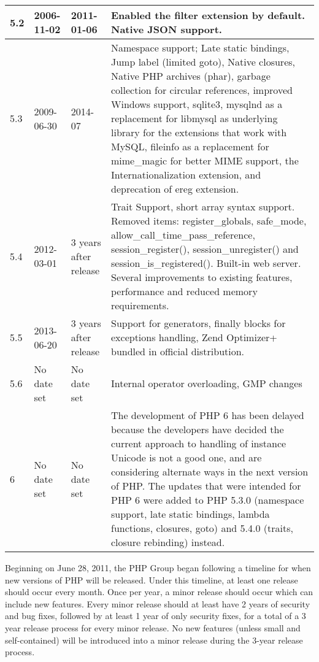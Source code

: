 \begin{longtable}{|m{25pt}|m{40pt}|m{60pt}|m{240pt}|}
\hline
5.2	&2006-11-02		&2011-01-06			&Enabled the filter extension by default. Native JSON support.\\
\hline
5.3	&2009-06-30		&2014-07				&Namespace support; 
												\newline Late static bindings, Jump label (limited goto), Native closures, Native PHP archives (phar), garbage collection for circular references, improved Windows support, sqlite3, mysqlnd as a replacement for libmysql as underlying library for the extensions that work with MySQL, fileinfo as a replacement for mime\_magic for better MIME support, the Internationalization extension, and deprecation of ereg extension.\\
\hline
5.4	&2012-03-01		&3 years after release	&Trait Support, short array syntax support. 
												\newline Removed items: register\_globals, safe\_mode, allow\_call\_time\_pass\_reference, session\_register(), session\_unregister() and session\_is\_registered(). 
												\newline Built-in web server.
												\newline Several improvements to existing features, performance and reduced memory requirements.\\
\hline
5.5	&2013-06-20		&3 years after release	&Support for generators, finally blocks for exceptions handling, Zend Optimizer+ bundled in official distribution.\\
\hline
5.6	&No date set		&No date set			&Internal operator overloading, GMP changes\\
\hline
6	&No date set		&No date set			&The development of PHP 6 has been delayed because the developers have decided the current approach to handling of instance Unicode is not a good one, and are considering alternate ways in the next version of PHP.
												\newline The updates that were intended for PHP 6 were added to PHP 5.3.0 (namespace support, late static bindings, lambda functions, closures, goto) and 5.4.0 (traits, closure rebinding) instead.\\
\hline

\end{longtable}

\vspace{-10pt}


Beginning on June 28, 2011, the PHP Group began following a timeline for when new versions of PHP will be released. Under this timeline, at least one release should occur every month. Once per year, a minor release should occur which can include new features. Every minor release should at least have 2 years of security and bug fixes, followed by at least 1 year of only security fixes, for a total of a 3 year release process for every minor release. No new features (unless small and self-contained) will be introduced into a minor release during the 3-year release process.


